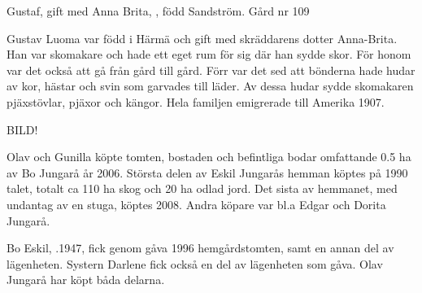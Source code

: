 Gustaf,  gift med Anna Brita, , född Sandström. Gård nr 109
\begin{jhchildren}
  \item {}
  \item {}
  \item {}
  \item {}
  \item {}
  \item {}
  \item {}
  \item {}
  \item {}
\end{jhchildren}
Gustav Luoma var född i Härmä och gift med skräddarens dotter Anna-Brita. Han var skomakare och hade ett eget rum för sig där han sydde skor. För honom var det också att gå från gård till gård. Förr var det sed att bönderna hade hudar av kor, hästar och svin som garvades till läder. Av dessa hudar sydde skomakaren pjäxstövlar, pjäxor och kängor. Hela familjen emigrerade till Amerika 1907.




BILD!

Olav och Gunilla köpte tomten, bostaden och befintliga bodar omfattande 0.5 ha av Bo Jungarå år 2006. Största delen av Eskil Jungarås hemman köptes på 1990 talet, totalt ca 110 ha skog och 20 ha odlad jord. Det sista av hemmanet, med undantag av en stuga, köptes 2008. Andra köpare var bl.a Edgar och Dorita Jungarå.


Bo Eskil, .1947, fick genom gåva 1996 hemgårdstomten, samt en annan del av lägenheten. Systern Darlene fick också en del av lägenheten som gåva. Olav Jungarå har köpt båda delarna.



